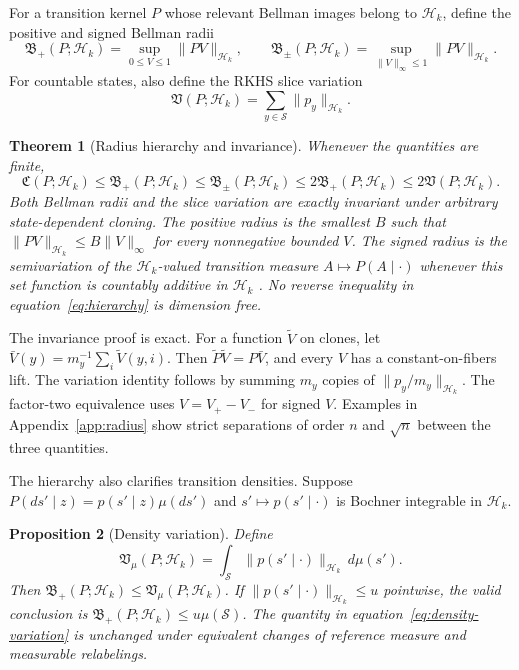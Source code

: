 \documentclass{article}
\newtheorem{theorem}{Theorem}
\newtheorem{proposition}[theorem]{Proposition}
\newcommand{\cH}{\mathcal H_k}
\newcommand{\cS}{\mathcal S}
\newcommand{\Bpos}{\mathfrak B_{+}}
\newcommand{\Bsgn}{\mathfrak B_{\pm}}
\newcommand{\Vrkhs}{\mathfrak V}
\newcommand{\Crkhs}{\mathfrak C}
\begin{document}
For a transition kernel $P$ whose relevant Bellman images belong to $\cH$, define the positive and signed Bellman radii
\begin{equation}
 \Bpos(P;\cH)=\sup_{0\leq V\leq1}\|PV\|_{\cH},
 \qquad
 \Bsgn(P;\cH)=\sup_{\|V\|_\infty\leq1}\|PV\|_{\cH}.
 \label{eq:radii}
\end{equation}
For countable states, also define the RKHS slice variation
\begin{equation}
 \Vrkhs(P;\cH)=\sum_{y\in\cS}\|p_y\|_{\cH}.
 \label{eq:variation}
\end{equation}

\begin{theorem}[Radius hierarchy and invariance]
\label{thm:radius}
Whenever the quantities are finite,
\begin{equation}
 \Crkhs(P;\cH)\leq\Bpos(P;\cH)
 \leq\Bsgn(P;\cH)\leq2\Bpos(P;\cH)
 \leq2\Vrkhs(P;\cH).
 \label{eq:hierarchy}
\end{equation}
Both Bellman radii and the slice variation are exactly invariant under arbitrary state-dependent cloning. The positive radius is the smallest $B$ such that $\|PV\|_{\cH}\leq B\|V\|_\infty$ for every nonnegative bounded $V$. The signed radius is the semivariation of the $\cH$-valued transition measure $A\mapsto P(A\mid\cdot)$ whenever this set function is countably additive in $\cH$ \citep{diestel1977vector}. No reverse inequality in equation~\eqref{eq:hierarchy} is dimension free.
\end{theorem}

The invariance proof is exact. For a function $\widetilde V$ on clones, let $\bar V(y)=m_y^{-1}\sum_i\widetilde V(y,i)$. Then $\widetilde P\widetilde V=P\bar V$, and every $V$ has a constant-on-fibers lift. The variation identity follows by summing $m_y$ copies of $\|p_y/m_y\|_{\cH}$. The factor-two equivalence uses $V=V_+-V_-$ for signed $V$. Examples in Appendix~\ref{app:radius} show strict separations of order $n$ and $\sqrt n$ between the three quantities.

The hierarchy also clarifies transition densities. Suppose $P(ds'\mid z)=p(s'\mid z)\mu(ds')$ and $s'\mapsto p(s'\mid\cdot)$ is Bochner integrable in $\cH$.

\begin{proposition}[Density variation]
\label{prop:density}
Define
\begin{equation}
 \Vrkhs_\mu(P;\cH)=
 \int_{\cS}\|p(s'\mid\cdot)\|_{\cH}\,d\mu(s').
 \label{eq:density-variation}
\end{equation}
Then $\Bpos(P;\cH)\leq\Vrkhs_\mu(P;\cH)$. If $\|p(s'\mid\cdot)\|_{\cH}\leq u$ pointwise, the valid conclusion is $\Bpos(P;\cH)\leq u\mu(\cS)$. The quantity in equation~\eqref{eq:density-variation} is unchanged under equivalent changes of reference measure and measurable relabelings.
\end{proposition}
\end{document}
